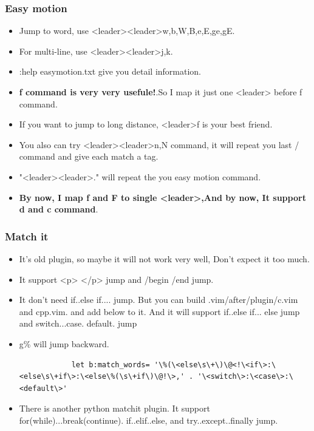 \documentclass[paper=8.5in:11in, twoside, 12pt, pagesize=pdftex]{book}
\begin{document}
	\subsubsection{Easy motion}
	\begin{itemize}
		\item Jump to word, use <leader><leader>w,b,W,B,e,E,ge,gE. 
		
		\item For multi-line, use <leader><leader>j,k.  
		
		\item :help easymotion.txt give you detail information.
		
		\item \textbf{f command is very very usefule!}.So I map it just one <leader> before f command. 
		
		\item If you want to jump to long distance, <leader>f is your best friend. 
		
		\item You also can try <leader><leader>n,N command, it will repeat you last / command and give each match a tag.
		
		\item "<leader><leader>."  will repeat the you easy motion command. 
		
		\item \textbf{By now, I map f and F to single <leader>,And by now, It support d and c command}.
	\end{itemize}
	
	\subsubsection{Match it}
	\begin{itemize}
		\item It's old plugin, so maybe it will not work very well, Don't expect it too much.
		\item It support <p> </p> jump and /begin /end jump.
		
		\item It don't need if..else if.... jump. But you can build .vim/after/plugin/c.vim and cpp.vim. and add below to it. And it will support if..else if... else jump and switch...case. default. jump
		
		\item g\% will jump backward. 
		\begin{verbatim}
			let b:match_words= '\%(\<else\s\+\)\@<!\<if\>:\<else\s\+if\>:\<else\%(\s\+if\)\@!\>,' . '\<switch\>:\<case\>:\<default\>'
		\end{verbatim}
		
		\item There is another python matchit plugin. It support for(while)...break(continue). if..elif..else, and try..except..finally jump.   
	\end{itemize}
	
\end{document}
